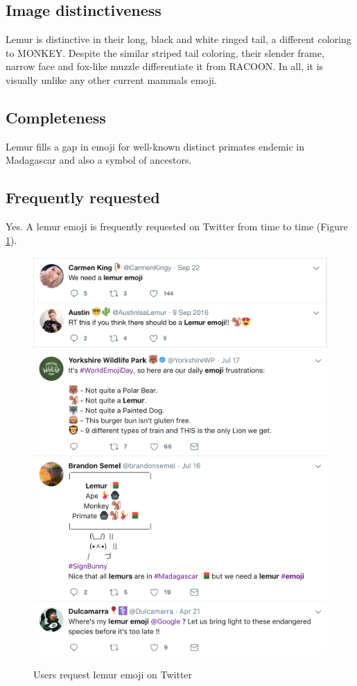 \documentclass{article}
\begin{document}
\subsection{Image distinctiveness}
Lemur is distinctive in their long, black and white ringed tail, a different coloring to MONKEY. Despite the similar striped tail coloring, 
their slender frame, narrow face and fox-like muzzle differentiate it from RACOON.
In all, it is visually unlike any other current mammals emoji.

\subsection{Completeness}
Lemur fills a gap in emoji for well-known distinct primates endemic in Madagascar and also a symbol of ancestors.

\subsection{Frequently requested}
Yes. A lemur emoji is frequently requested on Twitter from time to time (Figure \ref{fig:request-lemur-evidence-tweet}).

\begin{figure}
    \includegraphics[width=\linewidth]{img/request-lemur-evidence-tweet-1.png}
    \includegraphics[width=\linewidth]{img/request-lemur-evidence-tweet-2.png}
    \caption{Users request lemur emoji on Twitter}
    \label{fig:request-lemur-evidence-tweet}
  \end{figure}
\end{document}
